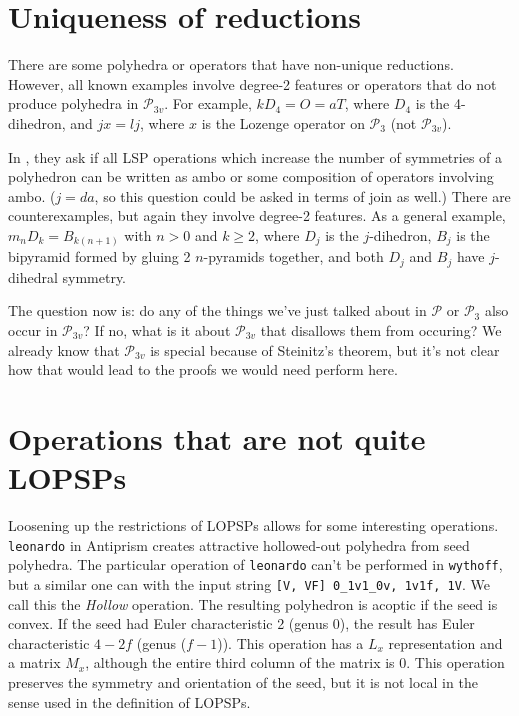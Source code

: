 \documentclass[12pt]{amsart}%
\begin{document}
\section{Uniqueness of reductions}
There are some polyhedra or operators that have non-unique reductions.
However, all known examples involve degree-2 features or operators that
do not produce polyhedra in $\mathcal{P}_{3v}$. For example,
$kD_4 = O = aT$, where $D_4$ is the 4-dihedron, and $jx = lj$, where
$x$ is the Lozenge operator on $\mathcal{P}_{3}$ (not $\mathcal{P}_{3v}$).

In \cite{brinkmann}, they ask if all LSP operations which increase the number
of symmetries of a polyhedron can be written as ambo or some composition of
operators involving ambo. ($j=da$, so this question could be asked in terms of
join as well.) There are counterexamples, but again they involve degree-2
features. As a general example, $m_n D_k = B_{k(n+1)}$ with $n>0$ and
$k\ge 2$, where $D_j$ is the $j$-dihedron,
$B_j$ is the bipyramid formed by gluing 2 $n$-pyramids together,
and both $D_j$ and $B_j$ have $j$-dihedral symmetry.

The question now is: do any of the things we've just talked about in
$\mathcal{P}$ or $\mathcal{P}_{3}$ also occur in $\mathcal{P}_{3v}$? If no,
what is it about $\mathcal{P}_{3v}$ that disallows them from occuring? We
already know that $\mathcal{P}_{3v}$ is special because of Steinitz's theorem,
but it's not clear how that would lead to the proofs we would need perform
here.

\section{Operations that are not quite LOPSPs}
Loosening up the restrictions of LOPSPs allows for some interesting operations.
\texttt{leonardo} in Antiprism creates attractive hollowed-out polyhedra from
seed polyhedra.\cite{antiprism} The particular operation of \texttt{leonardo}
can't be performed  in \texttt{wythoff}, but a similar one can with the input
string \texttt{[V, VF] 0\_1v1\_0v, 1v1f, 1V}. We call this the \textit{Hollow}
operation. The resulting polyhedron is acoptic if the seed is
convex. If the seed had Euler characteristic 2 (genus 0), the result has Euler
characteristic $4-2f$ (genus ($f-1$)). This operation has a $L_x$ representation
and a matrix $M_x$, although the entire third column of the matrix is 0. This
operation preserves the symmetry and orientation of the seed, but it is not
local in the sense used in the definition of LOPSPs.
\end{document}
